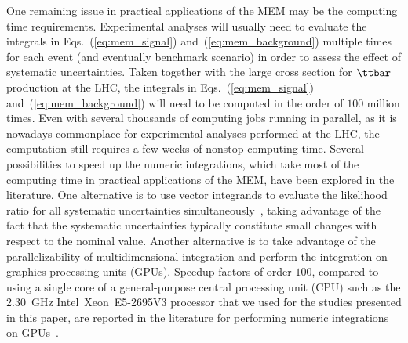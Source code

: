 One remaining issue in practical applications of the MEM may be the computing time requirements.
Experimental analyses will usually need to evaluate the integrals in Eqs.~(\ref{eq:mem_signal}) and~(\ref{eq:mem_background})
multiple times for each event (and eventually benchmark scenario) 
in order to assess the effect of systematic uncertainties.
Taken together with the large cross section for $\ttbar$ production at the LHC,
the integrals in Eqs.~(\ref{eq:mem_signal}) and~(\ref{eq:mem_background}) will need to be computed in the order of $100$ million times.
Even with several thousands of computing jobs running in parallel,
as it is nowadays commonplace for experimental analyses performed at the LHC,
the computation still requires a few weeks of nonstop computing time.
Several possibilities to speed up the numeric integrations, which take most of the computing time in practical applications of the MEM,
have been explored in the literature.
One alternative is to use vector integrands to evaluate the likelihood ratio for all systematic uncertainties simultaneously~\cite{CUBA},
taking advantage of the fact that the systematic uncertainties typically constitute small changes with respect to the nominal value.
Another alternative is to take advantage of the parallelizability of multidimensional integration and perform the integration on graphics processing units (GPUs).
Speedup factors of order $100$, compared to using a single core of a general-purpose central processing unit (CPU) 
such as the $2.30$~GHz Intel\TReg~Xeon\TReg~E5-2695V3 processor that we used for the studies presented in this paper,
are reported in the literature for performing numeric integrations on GPUs~\cite{Hagiwara:2009aq,Hagiwara:2009cy,Kanzaki:2010ym,Hagiwara:2013oka,Schouten:2014yza,Grasseau:2015vfa}.

